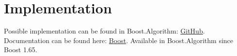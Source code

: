 \documentclass{wg21}
\begin{document}
\section{Implementation}
Possible implementation can be found in Boost.Algorithm: \href{https://github.com/boostorg/algorithm/blob/develop/include/boost/algorithm/is_partitioned_until.hpp}{GitHub}. Documentation can be found here: \href{https://www.boost.org/doc/libs/1_70_0/libs/algorithm/doc/html/the_boost_algorithm_library/Misc/is_partitioned_until.html}{Boost}. Available in Boost.Algorithm since Boost 1.65.
\end{document}
